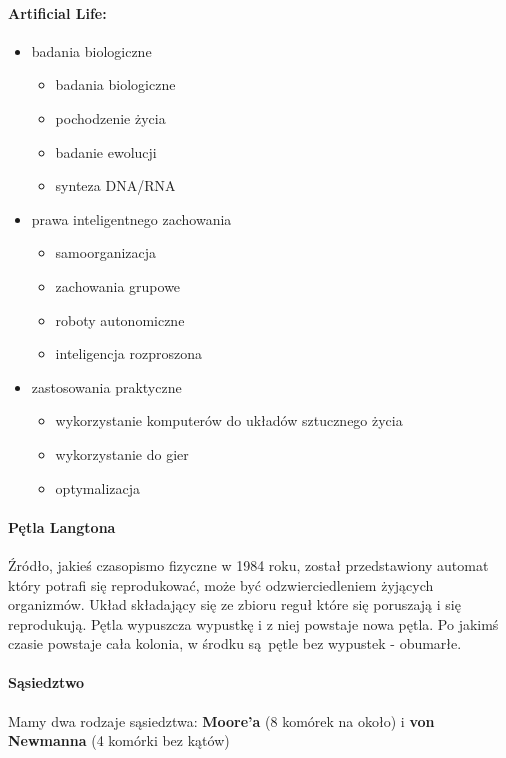 \documentclass{article}
\begin{document}
			\paragraph{Artificial Life:}
			\begin{itemize}
				\item badania biologiczne
				\begin{itemize}
					\item badania biologiczne
					\item pochodzenie życia
					\item badanie ewolucji
					\item synteza DNA/RNA
				\end{itemize}
				\item prawa inteligentnego zachowania
				\begin{itemize}
					\item samoorganizacja
					\item zachowania grupowe
					\item roboty autonomiczne
					\item inteligencja rozproszona
				\end{itemize}
			
				\item zastosowania praktyczne
				\begin{itemize}
					\item wykorzystanie komputerów do układów sztucznego życia
					\item wykorzystanie do gier
					\item optymalizacja
				\end{itemize}
			\end{itemize} 
			
			\paragraph{Pętla Langtona} Źródło, jakieś czasopismo fizyczne w 1984 roku, został przedstawiony automat który potrafi się reprodukować, może być odzwierciedleniem żyjących organizmów. Układ składający się ze zbioru reguł które się poruszają i się reprodukują. Pętla wypuszcza wypustkę i z niej powstaje nowa pętla. Po jakimś czasie powstaje cała kolonia, w środku są pętle bez wypustek - obumarłe.
			\paragraph{Sąsiedztwo} Mamy dwa rodzaje sąsiedztwa: \textbf{Moore'a} (8 komórek na około) i \textbf{von Newmanna} (4 komórki bez kątów)
\end{document}
